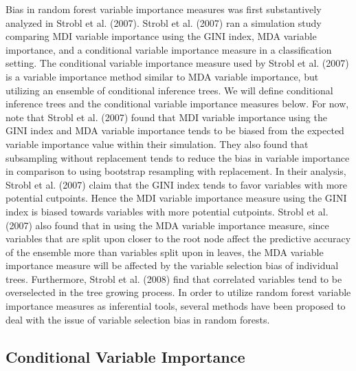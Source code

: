 \documentclass[12pt,twoside]{reedthesis}
\theoremstyle{definition}
\theoremstyle{definition}
\theoremstyle{definition}
\theoremstyle{remark}
\begin{document}
Bias in random forest variable importance measures was first
substantively analyzed in Strobl et al. (2007). Strobl et al. (2007) ran
a simulation study comparing MDI variable importance using the GINI
index, MDA variable importance, and a conditional variable importance
measure in a classification setting. The conditional variable importance
measure used by Strobl et al. (2007) is a variable importance method
similar to MDA variable importance, but utilizing an ensemble of
conditional inference trees. We will define conditional inference trees
and the conditional variable importance measures below. For now, note
that Strobl et al. (2007) found that MDI variable importance using the
GINI index and MDA variable importance tends to be biased from the
expected variable importance value within their simulation. They also
found that subsampling without replacement tends to reduce the bias in
variable importance in comparison to using bootstrap resampling with
replacement. In their analysis, Strobl et al. (2007) claim that the GINI
index tends to favor variables with more potential cutpoints. Hence the
MDI variable importance measure using the GINI index is biased towards
variables with more potential cutpoints. Strobl et al. (2007) also found
that in using the MDA variable importance measure, since variables that
are split upon closer to the root node affect the predictive accuracy of
the ensemble more than variables split upon in leaves, the MDA variable
importance measure will be affected by the variable selection bias of
individual trees. Furthermore, Strobl et al. (2008) find that correlated
variables tend to be overselected in the tree growing process. In order
to utilize random forest variable importance measures as inferential
tools, several methods have been proposed to deal with the issue of
variable selection bias in random forests.

\subsection{Conditional Variable
Importance}\label{conditional-variable-importance}
\end{document}
